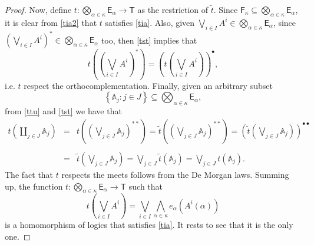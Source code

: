 \documentclass[10pt,a4paper]{amsart}
\begin{document}
\begin{proof}
Now, define $t:{\textstyle \bigotimes_{\alpha\in\kappa}}\mathsf{E}_{\alpha}\rightarrow\mathsf{T}$
as the restriction of $\tilde{t}$. Since $\mathsf{F}_{\kappa}\subseteq{\textstyle \bigotimes_{\alpha\in\kappa}}\mathsf{E}_{\alpha}$,
it is clear from \eqref{tia2} that $t$ satisfies \eqref{tia}. Also,
given ${\textstyle \bigvee_{i\in I}}A^{i}\in{\textstyle \bigotimes_{\alpha\in\kappa}}\mathsf{E}_{\alpha}$,
since $\left({\textstyle \bigvee_{i\in I}}A^{i}\right)^{*}\in{\textstyle \bigotimes_{\alpha\in\kappa}}\mathsf{E}_{\alpha}$
too, then \eqref{tst} implies that
\[
t\left(\left({\textstyle \bigvee_{i\in I}}A^{i}\right)^{*}\right)=\left(t\left({\textstyle \bigvee_{i\in I}}A^{i}\right)\right)^{\bullet},
\]
i.e. $t$ respect the orthocomplementation. Finally, given an arbitrary
subset 
\[
\left\{ \mathbb{A}_{j}:j\in J\right\} \subseteq{\textstyle \bigotimes_{\alpha\in\kappa}}\mathsf{E}_{\alpha},
\]
from \eqref{ttu} and \eqref{tst} we have that
\[
\begin{array}{lll}
t\left({\textstyle \coprod_{j\in J}}\mathbb{A}_{j}\right) & = & t\left(\left({\textstyle \bigvee_{j\in J}}\mathbb{A}_{j}\right)^{**}\right)=\tilde{t}\left(\left({\textstyle \bigvee_{j\in J}}\mathbb{A}_{j}\right)^{**}\right)=\left(\tilde{t}\left({\textstyle \bigvee_{j\in J}}\mathbb{A}_{j}\right)\right)^{\bullet\bullet}\\
\\
 & = & \tilde{t}\left({\textstyle \bigvee_{j\in J}}\mathbb{A}_{j}\right)={\textstyle \bigvee_{j\in J}}\tilde{t}\left(\mathbb{A}_{j}\right)={\textstyle \bigvee_{j\in J}}t\left(\mathbb{A}_{j}\right).
\end{array}
\]
The fact that $t$ respects the meets follows from the De Morgan laws.
Summing up, the function $t:{\textstyle \bigotimes_{\alpha\in\kappa}}\mathsf{E}_{\alpha}\rightarrow\mathsf{T}$
such that
\begin{equation}
t\left({\textstyle \bigvee_{i\in I}}A^{i}\right)={\textstyle \bigvee_{i\in I}}{\textstyle \bigwedge_{\alpha\in\kappa}}e_{\alpha}\left(A^{i}\left(\alpha\right)\right)\label{dt2}
\end{equation}
 is a homomorphism of logics that satisfies \eqref{tia}. It rests
to see that it is the only one.

\bigskip{}


\end{proof}
\end{document}
